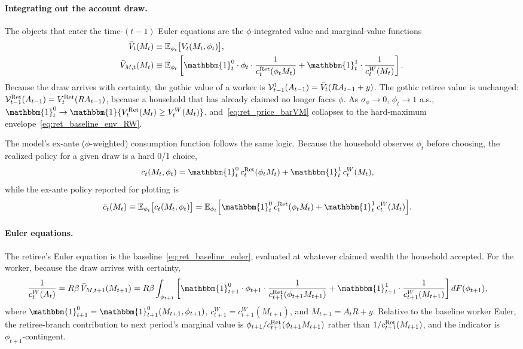 \paragraph{Integrating out the account draw.}
The objects that enter the time-$(t-1)$ Euler equations are the $\phi$-integrated value and marginal-value functions
\begin{align}
	\bar V_t(M_t)
	&\equiv \mathbb{E}_{\phi_t}\big[V_t(M_t,\phi_t)\big],
	\label{eq:ret_price_barV_defn}\\
	\bar V_{M,t}(M_t)
	&\equiv \mathbb{E}_{\phi_t}\left[
		\mathbbm{1}_t^{0}\cdot\phi_t\cdot\frac{1}{c_t^{\Ret}(\phi_t M_t)}
		+\mathbbm{1}_t^{1}\cdot\frac{1}{c_t^{W}(M_t)}
	\right].
	\label{eq:ret_price_barVM}
\end{align}
Because the draw arrives with certainty, the gothic value of a worker is $\mathcal{V}_{t-1}^{1}(A_{t-1})=\bar V_t(R A_{t-1}+y)$. The gothic retiree value is unchanged: $\mathcal{V}_{t-1}^{\mathrm{Ret}}(A_{t-1})=V_t^{\mathrm{Ret}}(R A_{t-1})$, because a household that has already claimed no longer faces $\phi$. As $\sigma_\phi\to 0$, $\phi_t\to 1$ a.s., $\mathbbm{1}_t^{0}\to\mathbbm{1}\{V_t^{\Ret}(M_t)\ge V_t^{W}(M_t)\}$, and~\eqref{eq:ret_price_barVM} collapses to the hard-maximum envelope~\eqref{eq:ret_baseline_env_RW}.

The model's ex-ante ($\phi$-weighted) consumption function follows the same logic. Because the household observes $\phi_t$ before choosing, the realized policy for a given draw is a hard 0/1 choice,
\begin{align}
	c_t(M_t,\phi_t)
	&= \mathbbm{1}_t^{0}\,c_t^{\Ret}(\phi_t M_t)
	+\mathbbm{1}_t^{1}\,c_t^{W}(M_t),
\end{align}
while the ex-ante policy reported for plotting is
\begin{align}
	\bar c_t(M_t)
	&\equiv \mathbb{E}_{\phi_t}\big[c_t(M_t,\phi_t)\big]
	= \mathbb{E}_{\phi_t}\Big[
		\mathbbm{1}_t^{0}\,c_t^{\Ret}(\phi_t M_t)
		+\mathbbm{1}_t^{1}\,c_t^{W}(M_t)
	\Big].
	\label{eq:ret_price_barc}
\end{align}

\paragraph{Euler equations.}
The retiree's Euler equation is the baseline~\eqref{eq:ret_baseline_euler}, evaluated at whatever claimed wealth the household accepted. For the worker, because the draw arrives with certainty,
\begin{align}
	\frac{1}{c_t^{W}(A_t)}
	&= R\beta\,\bar V_{M,t+1}(M_{t+1})
	= R\beta\int_{\phi_{t+1}}
	\left[
		\mathbbm{1}_{t+1}^{0}\cdot\phi_{t+1}\cdot\frac{1}{c_{t+1}^{\Ret}(\phi_{t+1} M_{t+1})}
		+\mathbbm{1}_{t+1}^{1}\cdot\frac{1}{c_{t+1}^{W}(M_{t+1})}
	\right]
	dF(\phi_{t+1}),
	\label{eq:ret_price_euler_W}
\end{align}
where $\mathbbm{1}_{t+1}^{0}=\mathbbm{1}_{t+1}^{0}(M_{t+1},\phi_{t+1})$, $c_{t+1}^{W}=c_{t+1}^{W}(M_{t+1})$, and $M_{t+1}=A_t R+y$. Relative to the baseline worker Euler, the retiree-branch contribution to next period's marginal value is $\phi_{t+1}/c_{t+1}^{\mathrm{Ret}}(\phi_{t+1} M_{t+1})$ rather than $1/c_{t+1}^{\mathrm{Ret}}(M_{t+1})$, and the indicator is $\phi_{t+1}$-contingent.

